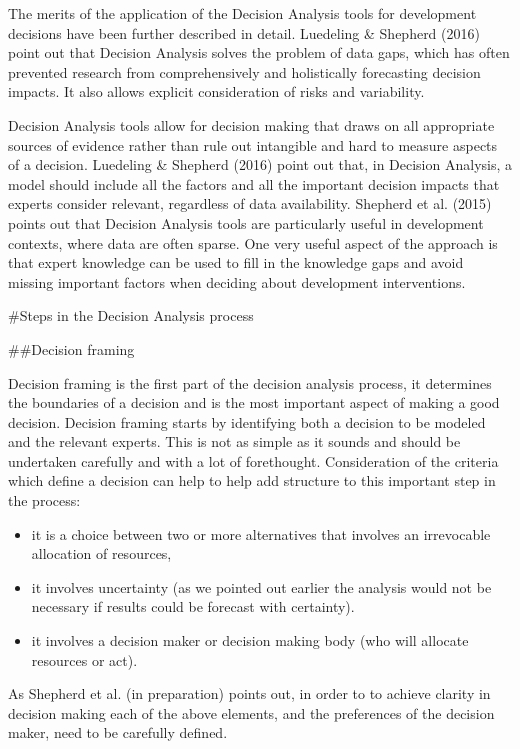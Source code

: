 \documentclass[
]{article}
\begin{document}
The merits of the application of the Decision Analysis tools for
development decisions have been further described in detail. Luedeling
\& Shepherd (2016) point out that Decision Analysis solves the problem
of data gaps, which has often prevented research from comprehensively
and holistically forecasting decision impacts. It also allows explicit
consideration of risks and variability.

Decision Analysis tools allow for decision making that draws on all
appropriate sources of evidence rather than rule out intangible and hard
to measure aspects of a decision. Luedeling \& Shepherd (2016) point out
that, in Decision Analysis, a model should include all the factors and
all the important decision impacts that experts consider relevant,
regardless of data availability. Shepherd et al. (2015) points out that
Decision Analysis tools are particularly useful in development contexts,
where data are often sparse. One very useful aspect of the approach is
that expert knowledge can be used to fill in the knowledge gaps and
avoid missing important factors when deciding about development
interventions.

\#Steps in the Decision Analysis process

\#\#Decision framing

Decision framing is the first part of the decision analysis process, it
determines the boundaries of a decision and is the most important aspect
of making a good decision. Decision framing starts by identifying both a
decision to be modeled and the relevant experts. This is not as simple
as it sounds and should be undertaken carefully and with a lot of
forethought. Consideration of the criteria which define a decision can
help to help add structure to this important step in the process:

\begin{itemize}
  \item it is a choice between two or more alternatives that involves an irrevocable allocation of resources, 
  \item it involves uncertainty (as we pointed out earlier the analysis would not be necessary if results could be forecast with certainty).
  \item it involves a decision maker or decision making body (who will allocate resources or act).
\end{itemize}

As Shepherd et al. (in preparation) points out, in order to to achieve
clarity in decision making each of the above elements, and the
preferences of the decision maker, need to be carefully defined.
\end{document}
